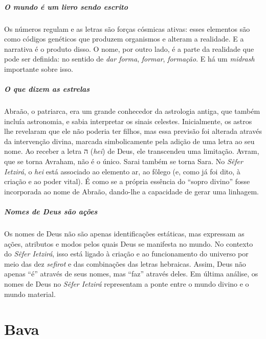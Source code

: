 \begin{center}
{\huge{}}
\end{center}

\paragraph{O mundo é um livro sendo escrito} Os números regulam e as letras são forças cósmicas ativas: esses elementos são como códigos genéticos que produzem organismos e alteram a realidade. E a narrativa é o produto disso. O nome, por outro lado, é a parte da realidade que pode ser definida: no sentido de \textit{dar forma}, \textit{formar}, \textit{formação}. E há um \textit{midrash} importante sobre isso. 

\paragraph{O que dizem as estrelas} Abraão, o patriarca, era um grande conhecedor da astrologia antiga, que também incluía astronomia, e sabia interpretar os sinais celestes. Inicialmente, os astros lhe revelaram que ele não poderia ter filhos, mas essa previsão foi alterada através da intervenção divina, marcada simbolicamente pela adição de uma letra ao seu nome. Ao receber a letra {\frank ה} (\textit{hei}) de Deus, ele transcendeu uma limitação. Avram, que se torna Avraham, não é o único. Sarai também se torna Sara. No \textit{Sêfer Ietzirá}, o \textit{hei} está associado ao elemento ar, ao fôlego (e, como já foi dito, à criação e ao poder vital). É como se a própria essência do ``sopro divino'' fosse incorporada ao nome de Abraão, dando-lhe a capacidade de gerar uma linhagem.

\paragraph{Nomes de Deus são ações} Os nomes de Deus não são apenas identificações estáticas, mas expressam as ações, atributos e modos pelos quais Deus se manifesta no mundo. No contexto do \textit{Sêfer Ietzirá}, isso está ligado à criação e ao funcionamento do universo por meio das dez \textit{sefirot} e das combinações das letras hebraicas. Assim, Deus não apenas ``é'' através de seus nomes, mas ``faz'' através deles. Em última análise, os nomes de Deus no \textit{Sêfer Ietzirá} representam a ponte entre o mundo divino e o mundo material.

\chapter*{Bava \smallskip{}}

